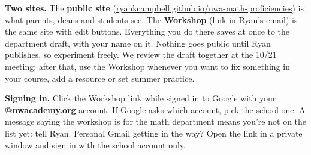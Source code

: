 \documentclass[10pt]{article}
\begin{document}

\textbf{Two sites.} The \textbf{public site}
(\href{https://ryankcampbell.github.io/nwa-math-proficiencies/}{ryankcampbell.github.io/nwa-math-proficiencies})
is what parents, deans and students see. The \textbf{Workshop} (link in Ryan's email) is the same site
with edit buttons. Everything you do there saves at once to the department draft, with your name on it.
Nothing goes public until Ryan publishes, so experiment freely. We review the draft together at the 10/21 meeting; after that, use the Workshop whenever you want to fix something in your course, add a resource or set summer practice.

\textbf{Signing in.} Click the Workshop link while signed in to Google with your
\textbf{@nwacademy.org} account. If Google asks which account, pick the school one. A message
saying the workshop is for the math department means you're not on the list yet: tell Ryan.
Personal Gmail getting in the way? Open the link in a private window and sign in with the school account only.
\end{document}
